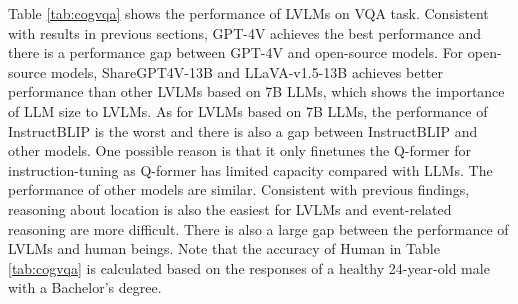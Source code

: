 Table \ref{tab:cogvqa} shows the performance of LVLMs on VQA task. 
Consistent with results in previous sections, GPT-4V achieves the best performance and there is a performance gap between GPT-4V and open-source models.
For open-source models, ShareGPT4V-13B and LLaVA-v1.5-13B achieves better performance than other LVLMs based on 7B LLMs, which shows the importance of LLM size to LVLMs.
As for LVLMs based on 7B LLMs, the performance of InstructBLIP is the worst and there is also a gap between InstructBLIP and other models. 
One possible reason is that it only finetunes the Q-former for instruction-tuning as Q-former has limited capacity compared with LLMs.
The performance of other models are similar.
Consistent with previous findings, reasoning about location is also the easiest for LVLMs and event-related reasoning are more difficult.
There is also a large gap between the performance of LVLMs and human beings.
Note that the accuracy of Human in Table \ref{tab:cogvqa} is calculated based on the responses of a healthy 24-year-old male with a Bachelor's degree.

